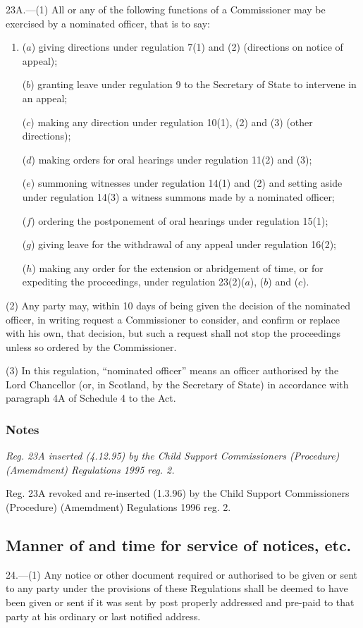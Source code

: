 \documentclass[a4paper]{article}
\newcommand\amendment[1]{\subsubsection*{Notes}{\itshape\frenchspacing\footnotesize #1 \par}}
\begin{document}
23A.—(1) All or any of the following functions of a Commissioner may be exercised by a nominated officer, that is to say:
\begin{enumerate}\item[]
($a$) giving directions under regulation 7(1) and (2) (directions on notice of appeal);

($b$) granting leave under regulation 9 to the Secretary of State to intervene in an appeal;

($c$) making any direction under regulation 10(1), (2) and (3) (other directions);

($d$) making orders for oral hearings under regulation 11(2) and (3);

($e$) summoning witnesses under regulation 14(1) and (2) and setting aside under regulation 14(3) a witness summons made by a nominated officer;

($f$) ordering the postponement of oral hearings under regulation 15(1);

($g$) giving leave for the withdrawal of any appeal under regulation 16(2);

($h$) making any order for the extension or abridgement of time, or for expediting the proceedings, under regulation 23(2)($a$), ($b$) and ($c$).
\end{enumerate}

(2) Any party may, within 10 days of being given the decision of the nominated officer, in writing request a Commissioner to consider, and confirm or replace with his own, that decision, but such a request shall not stop the proceedings unless so ordered by the Commissioner.

(3) In this regulation, “nominated officer” means an officer authorised by the Lord Chancellor (or, in Scotland, by the Secretary of State) in accordance with paragraph 4A of Schedule 4 to the Act.

\amendment{
Reg. 23A inserted (4.12.95) by the Child Support Commissioners (Procedure) (Amemdment) Regulations 1995 reg. 2.

Reg. 23A revoked and re-inserted (1.3.96) by the Child Support Commissioners (Procedure) (Amemdment) Regulations 1996 reg. 2.
}

\subsection[24. Manner of and time for service of notices, etc.]{Manner of and time for service of notices, etc.}

24.—(1) Any notice or other document required or authorised to be given or sent to any party under the provisions of these Regulations shall be deemed to have been given or sent if it was sent by post properly addressed and pre-paid to that party at his ordinary or last notified address.
\end{document}
